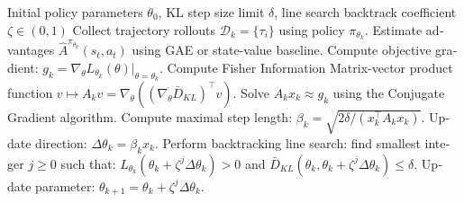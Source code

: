 \begin{latin}
\begin{algorithm}[H]
\caption{Trust Region Policy Optimization (TRPO)}
\begin{algorithmic}[1]
\Require Initial policy parameters $\theta_0$, KL step size limit $\delta$, line search backtrack coefficient $\zeta \in (0, 1)$
    \State Collect trajectory rollouts $\mathcal{D}_k = \{\tau_i\}$ using policy $\pi_{\theta_k}$.
    \State Estimate advantages $\hat{A}^{\pi_{\theta_k}}(s_t, a_t)$ using GAE or state-value baseline.
    \State Compute objective gradient: $g_k = \nabla_\theta L_{\theta_k}(\theta)|_{\theta = \theta_k}$.
    \State Compute Fisher Information Matrix-vector product function $v \mapsto A_k v = \nabla_\theta \left( (\nabla_\theta \bar{D}_{KL})^\top v \right)$.
    \State Solve $A_k x_k \approx g_k$ using the Conjugate Gradient algorithm.
    \State Compute maximal step length: $\beta_k = \sqrt{2\delta / (x_k^\top A_k x_k)}$.
    \State Update direction: $\Delta \theta_k = \beta_k x_k$.
    \State Perform backtracking line search: find smallest integer $j \ge 0$ such that:
    \State \quad $L_{\theta_k}(\theta_k + \zeta^j \Delta \theta_k) > 0$ and $\bar{D}_{KL}(\theta_k, \theta_k + \zeta^j \Delta \theta_k) \le \delta$.
    \State Update parameter: $\theta_{k+1} = \theta_k + \zeta^j \Delta \theta_k$.
\EndFor
\end{algorithmic}
\end{algorithm}
\end{latin}

